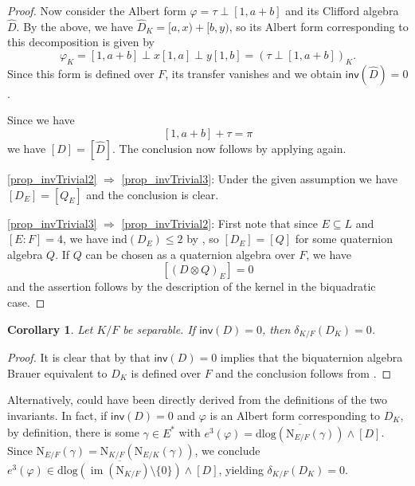 \documentclass{amsart}
\newtheorem{corollary}[definition]{Corollary}
\numberwithin{equation}{section}
\newcommand{\im}{\operatorname{im}}
\newcommand{\ind}{\mathrm{ind}}
\newcommand{\quat}[1]{[#1)}
\newcommand{\norm}{\mathrm{N}}
\newcommand{\dlog}{\mathrm{dlog}}
\newcommand{\inv}{\mathsf{inv}}
\begin{document}
\begin{proof}
        Now consider the Albert form $\varphi = \tau \perp [1, a + b]$ and its Clifford algebra $\widehat D$.
        By the above, we have $\widehat D_K = \quat{a, x} + \quat{b, y}$, so its Albert form corresponding to this decomposition is given by 
        \[\varphi_K = [1, a+b] \perp x[1, a] \perp y [1, b] = (\tau \perp [1, a + b])_K.\]
        Since this form is defined over $F$, its transfer vanishes and we obtain $\inv(\widehat D) = 0$.
        
        Since we have
        \[[1, a + b] + \tau = \pi\]
        we have $[D] = [\widehat D]$.
        The conclusion now follows by applying  again.

    \ref{prop_invTrivial2} $\Rightarrow$ \ref{prop_invTrivial3}:
        Under the given assumption we have $[D_E] = [Q_E]$ and the conclusion is clear.

    \ref{prop_invTrivial3} $\Rightarrow$ \ref{prop_invTrivial2}:
        First note that since $E \subseteq L$ and $[E : F] = 4$, we have $\ind(D_E) \leq 2$ by \cite[Corollary 4.5.11]{GilleSzamuely_CSAGalCohomology}, so $[D_E] = [Q]$ for some quaternion algebra $Q$.
        If $Q$ can be chosen as a quaternion algebra over $F$, we have
            \[[(D \otimes Q)_E] = 0\]
        and the assertion follows by the description of the kernel in the biquadratic case.
\end{proof}

\begin{corollary} \label{cor_Inv0ImpliesDelta0}
	Let $K/F$ be separable.
	If $\inv(D) = 0$, then $\delta_{K/F}(D_K) = 0$.
\end{corollary}
\begin{proof}
	It is clear that by  that $\inv(D) = 0$ implies that the biquaternion algebra Brauer equivalent to $D_K$ is defined over $F$ and the conclusion follows from \cite[Theorem 3.6]{BarryChapmanLaghribi_DescentBiquaternion}.
\end{proof}

Alternatively,  could have been directly derived from the definitions of the two invariants. 
In fact, if $\inv(D) = 0$ and $\varphi$ is an Albert form corresponding to $D_K$, by definition, there is some $\gamma \in E^\ast$ with $e^3(\varphi) = \overline{\dlog(\norm_{E/F}(\gamma))} \wedge [D]$.
Since $\norm_{E/F}(\gamma) = \norm_{K/F}(\norm_{E/K}(\gamma))$, we conclude $e^3(\varphi) \in \overline{\dlog(\im(\norm_{K/F})\setminus\{0\})} \wedge [D]$, yielding $\delta_{K/F}(D_K) = 0$.
\end{document}
